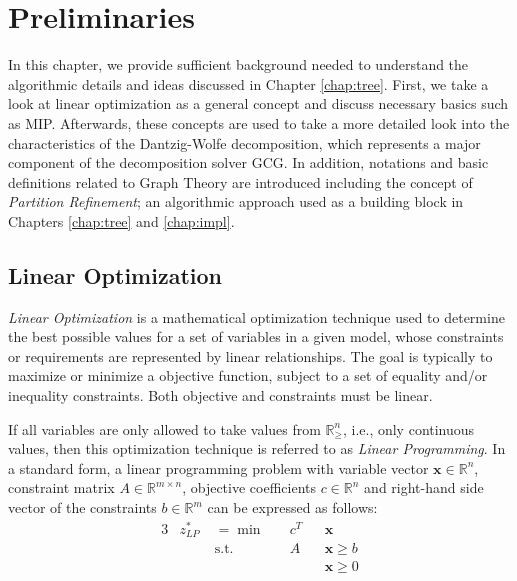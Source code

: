 \chapter{Preliminaries}

	In this chapter, we provide sufficient background needed to understand the algorithmic details and ideas discussed in Chapter \ref{chap:tree}.
	First, we take a look at linear optimization as a general concept and discuss necessary basics such as \ac{MIP}.
	Afterwards, these concepts are used to take a more detailed look into the characteristics of the Dantzig-Wolfe decomposition, which represents a major component of the decomposition solver \acs{GCG}.
	In addition, notations and basic definitions related to Graph Theory are introduced including the concept of \textit{Partition Refinement}; an algorithmic approach used as a building block in Chapters \ref{chap:tree} and \ref{chap:impl}.

	\section{Linear Optimization}

		\textit{Linear Optimization} is a mathematical optimization technique used to determine the best possible values for a set of variables in a given model, whose constraints or requirements are represented by linear relationships. The goal is typically to maximize or minimize a objective function, subject to a set of equality and/or inequality constraints. Both objective and constraints must be linear.

		If all variables are only allowed to take values from $\mathbb{R}^n_{\geq}$, i.e., only continuous values, then this optimization technique is referred to as \textit{Linear Programming}.
		In a standard form, a linear programming problem with variable vector $\mathbf{x} \in \mathbb{R}^n$, constraint matrix $A \in \mathbb{R}^{m \times n}$, objective coefficients $c \in \mathbb{R}^n$ and right-hand side vector of the constraints $b \in \mathbb{R}^m$ can be expressed as follows:
		\begin{alignat}{3}
			&z^*_{LP} \; &={}	\min	&\quad  c^T && \mathbf{x} \label{eq:prelims:linprog:obj} \\
			&				  		& \text{s.t.} & \quad A && \mathbf{x} \geq b \label{eq:prelims:linprog:A} \\
			&						&					 &					&& \mathbf{x} \geq 0 \label{eq:prelims:linprog:nonneg}
		\end{alignat}

